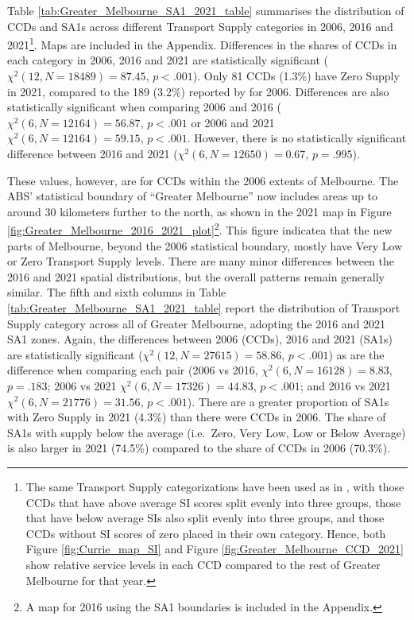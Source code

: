 \documentclass[preprint, 3p,
authoryear]{elsarticle} %
\begin{document}
Table \ref{tab:Greater_Melbourne_SA1_2021_table} summarises the
distribution of CCDs and SA1s across different Transport Supply
categories in 2006, 2016 and 2021\footnote{The same Transport Supply
  categorizations have been used as in \citet{currie2010identifying},
  with those CCDs that have above average SI scores split evenly into
  three groups, those that have below average SIs also split evenly into
  three groups, and those CCDs without SI scores of zero placed in their
  own category. Hence, both Figure \ref{fig:Currie_map_SI} and Figure
  \ref{fig:Greater_Melbourne_CCD_2021} show relative service levels in
  each CCD compared to the rest of Greater Melbourne for that year.}.
Maps are included in the Appendix. Differences in the shares of CCDs in
each category in 2006, 2016 and 2021 are statistically significant
(\(\chi^2(12, N = 18489) = 87.45\), \(p < .001\)). Only 81 CCDs (1.3\%)
have Zero Supply in 2021, compared to the 189 (3.2\%) reported by
\citet{currie2010identifying} for 2006. Differences are also
statistically significant when comparing 2006 and 2016
(\(\chi^2(6, N = 12164) = 56.87\), \(p < .001\) or 2006 and 2021
\(\chi^2(6, N = 12164) = 59.15\), \(p < .001\). However, there is no
statistically significant difference between 2016 and 2021
(\(\chi^2(6, N = 12650) = 0.67\), \(p = .995\)).

These values, however, are for CCDs within the 2006 extents of
Melbourne. The ABS' statistical boundary of ``Greater Melbourne'' now
includes areas up to around 30 kilometers further to the north, as shown
in the 2021 map in Figure
\ref{fig:Greater_Melbourne_2016_2021_plot}\footnote{A map for 2016 using
  the SA1 boundaries is included in the Appendix.}. This figure
indicatea that the new parts of Melbourne, beyond the 2006 statistical
boundary, mostly have Very Low or Zero Transport Supply levels. There
are many minor differences between the 2016 and 2021 spatial
distributions, but the overall patterns remain generally similar. The
fifth and sixth columns in Table
\ref{tab:Greater_Melbourne_SA1_2021_table} report the distribution of
Transport Supply category across all of Greater Melbourne, adopting the
2016 and 2021 SA1 zones. Again, the differences between 2006 (CCDs),
2016 and 2021 (SA1s) are statistically significant
(\(\chi^2(12, N = 27615) = 58.86\), \(p < .001\)) as are the difference
when comparing each pair (2006 vs 2016, \(\chi^2(6, N = 16128) = 8.83\),
\(p = .183\); 2006 vs 2021 \(\chi^2(6, N = 17326) = 44.83\),
\(p < .001\); and 2016 vs 2021 \(\chi^2(6, N = 21776) = 31.56\),
\(p < .001\)). There are a greater proportion of SA1s with Zero Supply
in 2021 (4.3\%) than there were CCDs in 2006. The share of SA1s with
supply below the average (i.e.~Zero, Very Low, Low or Below Average) is
also larger in 2021 (74.5\%) compared to the share of CCDs in 2006
(70.3\%).
\end{document}
